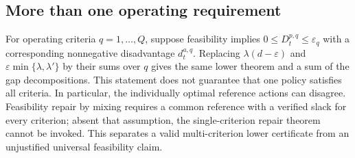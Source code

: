 \subsection{More than one operating requirement}
For operating criteria $q=1,\ldots,Q$, suppose feasibility implies $0\le D_t^{p,q}\le\varepsilon_q$ with a corresponding nonnegative disadvantage $d_t^{a,q}$. Replacing $\lambda(d-\varepsilon)$ and $\varepsilon\min\{\lambda,\lambda'\}$ by their sums over $q$ gives the same lower theorem and a sum of the gap decompositions. This statement does not guarantee that one policy satisfies all criteria. In particular, the individually optimal reference actions can disagree. Feasibility repair by mixing requires a common reference with a verified slack for every criterion; absent that assumption, the single-criterion repair theorem cannot be invoked. This separates a valid multi-criterion lower certificate from an unjustified universal feasibility claim.
